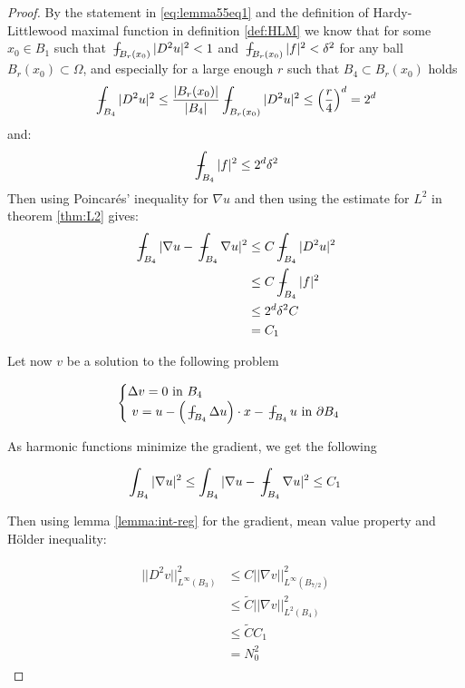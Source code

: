 \documentclass[12pt]{artikel1}
\begin{document}
\begin{proof}
    By the statement in \ref{eq:lemma55eq1} and the definition of Hardy-Littlewood maximal function in definition \ref{def:HLM} we know that for some $x_0\in B_1$ such that $\intavg_{B_r(x_0)}|D^2u|^2<1$ and $\intavg_{B_r(x_0)}|f|^2<\delta^2$ for any ball $B_r(x_0)\subset\Omega$, and especially for a large enough $r$ such that $B_4\subset B_r(x_0)$ holds
    \begin{equation*}
        \intavg_{B_4}|D^2u|^2\leq\frac{|B_r(x_0)|}{|B_4|}\intavg_{B_r(x_0)}|D^2u|^2\leq\left(\frac{r}{4}\right)^d=2^d
    \end{equation*}
    and:
    \begin{equation*}
        \intavg_{B_4}|f|^2\leq2^d\delta^2
    \end{equation*}
    Then using Poincar\'{e}s' inequality for $\nabla u$ and then using the estimate for $L^2$ in theorem \ref{thm:L2} gives:
    \begin{align*}
        \intavg_{B_4}|\nabla u-\intavg_{B_4}\nabla u|^2&\leq C\intavg_{B_4}|D^2u|^2\\
        &\leq C\intavg_{B_4}|f|^2\\
        &\leq2^d\delta^2C\\
        &=C_1
    \end{align*}

Let now $v$ be a solution to the following problem

\begin{equation*}
    \begin{cases}
        \Delta v=0\text{ in }B_4 \\\
        v = u-\left(\intavg_{B_4}\Delta u\right)\cdot x-\intavg_{B_4}u\text{ in }\partial B_4
    \end{cases}
\end{equation*}

\noindent As harmonic functions minimize the gradient, we get the following

\begin{equation*}
    \int_{B_4}|\nabla u|^2\leq\int_{B_4}|\nabla u-\intavg_{B_4}\nabla u|^2\leq C_1
\end{equation*}

\noindent Then using lemma \ref{lemma:int-reg} for the gradient, mean value property and Hölder inequality:

\begin{align}\label{eq:N-ineq}
\begin{split}
    ||D^2v||^2_{L^\infty(B_3)}&\leq C||\nabla v||^2_{L^\infty(B_{7/2})} \\
    &\leq \tilde{C}||\nabla v||^2_{L^2(B_4)} \\
    &\leq \tilde{C}C_1 \\
    &=N_0^2
\end{split}
\end{align}


\end{proof}
\end{document}
